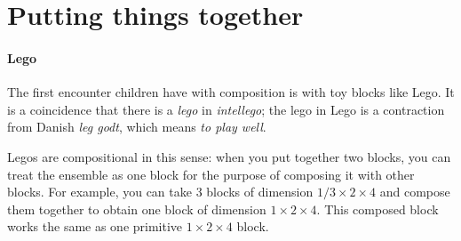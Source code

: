 

\section{Putting things together}

\paragraph{Lego}

The first encounter children have with composition is with toy blocks like Lego. It is a coincidence that there is a \emph{lego} in \emph{intellego}; the lego in Lego is a contraction from Danish \emph{leg godt}, which means \emph{to play well}.

Legos are compositional in this sense: when you put together two blocks, you can treat the ensemble as one block for the purpose of composing it with other blocks. For example, you can take 3 blocks of dimension $1/3 \times 2 \times 4$ and compose them together to obtain one block of dimension $1 \times 2 \times 4$. This composed block works the same as one primitive  $1 \times 2 \times 4 $ block.

\hfill
{}
\hfill
{}
\hfill


